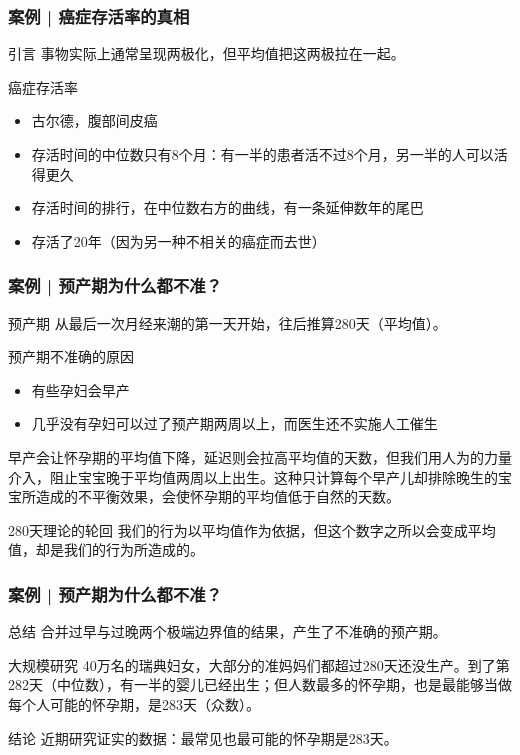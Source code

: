 \begin{frame}
  \frametitle{案例 | 癌症存活率的真相}
  \begin{block}{引言}
    事物实际上通常呈现两极化，但平均值把这两极拉在一起。
  \end{block}
  \pause
  \begin{block}{癌症存活率}
    \begin{itemize}
      \item 古尔德，腹部间皮癌
      \item 存活时间的中位数只有8个月：有一半的患者活不过8个月，另一半的人可以活得更久
      \item 存活时间的排行，在中位数右方的曲线，有一条延伸数年的尾巴
      \item 存活了20年（因为另一种不相关的癌症而去世）
    \end{itemize}
  \end{block}
\end{frame}

\begin{frame}
  \frametitle{案例 | 预产期为什么都不准？}
  \begin{block}{预产期}
    从最后一次月经来潮的第一天开始，往后推算280天（平均值）。
  \end{block}
  \pause
  \begin{block}{预产期不准确的原因}
    \begin{itemize}
      \item 有些孕妇会早产
      \item 几乎没有孕妇可以过了预产期两周以上，而医生还不实施人工催生
    \end{itemize}
早产会让怀孕期的平均值下降，延迟则会拉高平均值的天数，但我们用人为的力量介入，阻止宝宝晚于平均值两周以上出生。这种只计算每个早产儿却排除晚生的宝宝所造成的不平衡效果，会使怀孕期的平均值低于自然的天数。
  \end{block}
  \pause
  \begin{block}{280天理论的轮回}
    我们的行为以平均值作为依据，但这个数字之所以会变成平均值，却是我们的行为所造成的。
  \end{block}
\end{frame}

\begin{frame}
  \frametitle{案例 | 预产期为什么都不准？}
  \begin{block}{总结}
    合并过早与过晚两个极端边界值的结果，产生了不准确的预产期。
  \end{block}
  \pause
  \begin{block}{大规模研究}
    40万名的瑞典妇女，大部分的准妈妈们都超过280天还没生产。到了第282天（中位数），有一半的婴儿已经出生；但人数最多的怀孕期，也是最能够当做每个人可能的怀孕期，是283天（众数）。
  \end{block}
  \pause
  \begin{block}{结论}
    近期研究证实的数据：最常见也最可能的怀孕期是283天。
  \end{block}
\end{frame}

